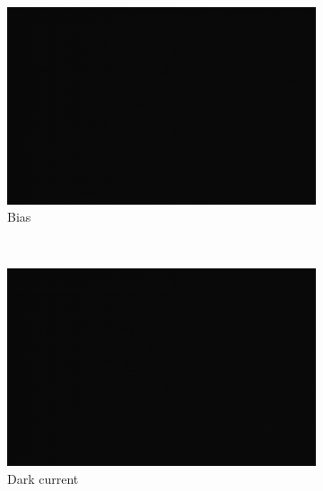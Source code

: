 \documentclass[a4paper,12pt]{article}
\begin{document}
\begin{figure}[H]
        \centering
        \begin{subfigure}[H]{0.3\textwidth}
                \includegraphics[width=\textwidth]{bias1}
                \caption{Bias}
                \label{fig:bias}
        \end{subfigure}%
        ~ %
        \begin{subfigure}[H]{0.3\textwidth}
                \includegraphics[width=\textwidth]{dark1}
                \caption{Dark current}
                \label{fig:dark current}
        \end{subfigure}
        ~ %
        \begin{subfigure}[H]{0.3\textwidth}

\end{subfigure}
\end{figure}
\end{document}
